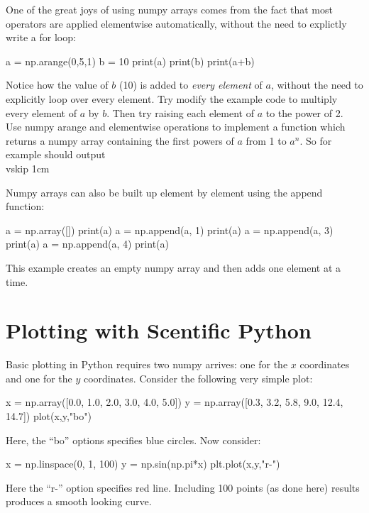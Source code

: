 One of the great joys of using numpy arrays comes from the fact that
most operators are applied elementwise automatically, without the need
to explictly write a for loop:
\begin{python}
a = np.arange(0,5,1)
b = 10
print(a)
print(b)
print(a+b)
\end{python}
Notice how the value of $b$ (10) is added to {\em every element} of
$a$, without the need to explicitly loop over every element.  Try
modify the example code to multiply every element of $a$ by $b$. Then
try raising each element of $a$ to the power of 2. \\

\plot Use numpy arange and elementwise operations to implement a
function  which returns a numpy array
containing the first powers of $a$ from 1 to $a^n$.  So for example
 should output \pyth{[ 1 2 4 8 16]} \\ vskip
1cm

Numpy arrays can also be built up element by element using the append
function:
\begin{python}
a = np.array([])
print(a)
a = np.append(a, 1)
print(a)
a = np.append(a, 3)
print(a)
a = np.append(a, 4)
print(a)
\end{python}
This example creates an empty numpy array and then adds one element at a time.



\section{Plotting with Scentific Python}

Basic plotting in Python requires two numpy arrives: one for the $x$
coordinates and one for the $y$ coordinates.  Consider the following
very simple plot:
\begin{python}
x = np.array([0.0, 1.0, 2.0, 3.0, 4.0,  5.0])
y = np.array([0.3, 3.2, 5.8, 9.0, 12.4, 14.7])
plot(x,y,"bo")
\end{python}
Here, the ``bo'' options specifies blue circles.  Now consider:
\begin{python}
x = np.linspace(0, 1, 100)
y = np.sin(np.pi*x)
plt.plot(x,y,"r-")
\end{python}
Here the ``r-'' option specifies red line.  Including 100 points (as
done here) results produces a smooth looking curve.

